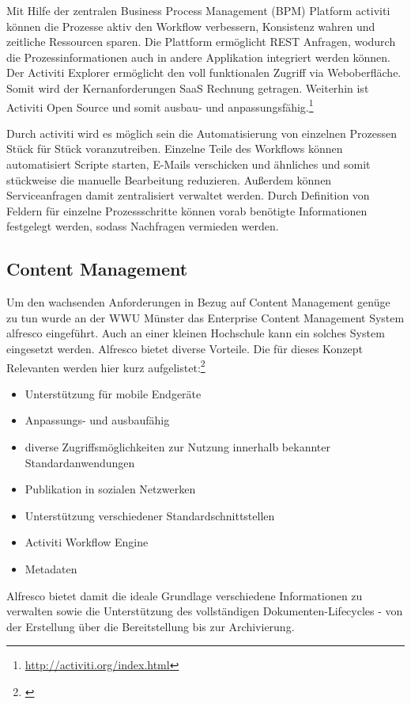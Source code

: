 Mit Hilfe der zentralen Business Process Management (BPM) Platform activiti können die Prozesse aktiv den Workflow verbessern, Konsistenz wahren und zeitliche Ressourcen sparen.  Die Plattform ermöglicht REST Anfragen, wodurch die Prozessinformationen auch in andere Applikation integriert werden können. Der Activiti Explorer ermöglicht den voll funktionalen Zugriff via Weboberfläche. Somit wird der Kernanforderungen SaaS Rechnung getragen. Weiterhin ist Activiti Open Source und somit ausbau- und anpassungsfähig.\footnote{\url{http://activiti.org/index.html}}

Durch activiti wird es möglich sein die Automatisierung von einzelnen Prozessen Stück für Stück voranzutreiben. Einzelne Teile des Workflows können automatisiert Scripte starten, E-Mails verschicken und ähnliches und somit stückweise die manuelle Bearbeitung reduzieren. Außerdem können Serviceanfragen damit zentralisiert verwaltet werden. Durch Definition von Feldern für einzelne Prozessschritte können vorab benötigte Informationen festgelegt werden, sodass Nachfragen vermieden werden.

\subsection{Content Management}
Um den wachsenden Anforderungen in Bezug auf Content Management genüge zu tun wurde an der WWU Münster das Enterprise Content Management System alfresco eingeführt. Auch an einer kleinen Hochschule kann ein solches System eingesetzt werden. Alfresco bietet diverse Vorteile. Die für dieses Konzept Relevanten werden hier kurz aufgelistet:\footnote{\cite{kloetgen_2012}}

\begin{itemize}
	\item Unterstützung für mobile Endgeräte
	\item Anpassungs- und ausbaufähig
	\item diverse Zugriffsmöglichkeiten zur Nutzung innerhalb bekannter Standardanwendungen
	\item Publikation in sozialen Netzwerken
	\item Unterstützung verschiedener Standardschnittstellen
	\item Activiti Workflow Engine
	\item Metadaten
\end{itemize}

Alfresco bietet damit die ideale Grundlage verschiedene Informationen zu verwalten sowie die Unterstützung des vollständigen Dokumenten-Lifecycles - von der Erstellung über die Bereitstellung bis zur Archivierung. 

